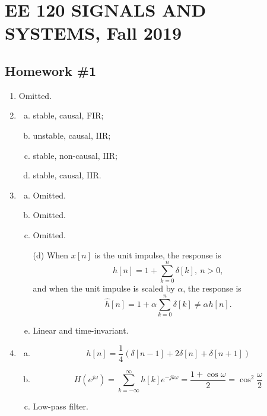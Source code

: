 \documentclass{article}
\begin{document}
\section*{EE 120 SIGNALS AND SYSTEMS, Fall 2019}
    \subsection*{Homework \#1}
        \begin{enumerate}
            \item Omitted.
            
            \item 
            \begin{enumerate}[(a)]
                \item stable, causal, FIR;
                \item unstable, causal, IIR;
                \item stable, non-causal, IIR;
                \item stable, causal, IIR.
            \end{enumerate}

            \item 
            \begin{enumerate}[(a)]
                \item Omitted.
                \item Omitted.
                \item Omitted.
                \item[(d)] When $x[n]$ is the unit impulse, the response is \[
                    h[n] = 1 + \sum_{k = 0}^{n} \delta[k],\ n > 0,
                \]
                and when the unit impulse is scaled by $\alpha$, the response is \[
                    \hat{h} [n] = 1 + \alpha\sum_{k = 0}^{n} \delta[k] \neq \alpha h[n].
                \]
                \item Linear and time-invariant.
            \end{enumerate}
            
            \item 
            \begin{enumerate}[(a)]
                \item \[
                    h[n] = \frac{1}{4}(\delta[n - 1] + 2\delta[n] + \delta[n + 1])
                \]
                \item \[
                    H(e^{j\omega}) = \sum\limits_{k=-\infty}^{\infty} h[k] e^{-jk\omega} = \frac{1 + \cos\omega}{2} = \cos^2 \frac{\omega}{2}
                \]
                \item Low-pass filter.
            \end{enumerate}	
            

\end{enumerate}
\end{document}
